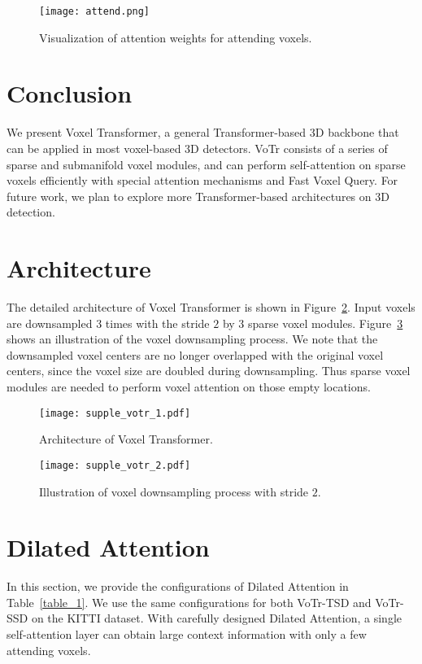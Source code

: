 \documentclass[10pt,twocolumn,letterpaper]{article}
\begin{document}
\begin{figure}[!t]
\centering
\texttt{[image: attend.png]}
\caption{Visualization of attention weights for attending voxels.}
\label{fig_weights}
\vspace{-2mm}
\end{figure}

\section{Conclusion}
We present Voxel Transformer, a general Transformer-based 3D backbone that can be applied in most voxel-based 3D detectors. VoTr consists of a series of sparse and submanifold voxel modules, and can perform self-attention on sparse voxels efficiently with special attention mechanisms and Fast Voxel Query. For future work, we plan to explore more Transformer-based architectures on 3D detection.


{\small


}
\clearpage
\appendix

\section{Architecture}
The detailed architecture of Voxel Transformer is shown in Figure~\ref{fig_achitect}. Input voxels are downsampled $3$ times with the stride $2$ by $3$ sparse voxel modules. Figure~\ref{fig_downsample} shows an illustration of the voxel downsampling process. We note that the downsampled voxel centers are no longer overlapped with the original voxel centers, since the voxel size are doubled during downsampling. Thus sparse voxel modules are needed to perform voxel attention on those empty locations.  

\begin{figure}[!t]
\centering
\texttt{[image: supple\_votr\_1.pdf]}
\caption{Architecture of Voxel Transformer.}
\label{fig_achitect}
\end{figure}

\begin{figure}[!t]
\centering
\texttt{[image: supple\_votr\_2.pdf]}
\caption{Illustration of voxel downsampling process with stride $2$.}
\label{fig_downsample}
\end{figure}

\section{Dilated Attention}
In this section, we provide the configurations of Dilated Attention in Table~\ref{table_1}. We use the same configurations for both VoTr-TSD and VoTr-SSD on the KITTI dataset. With carefully designed Dilated Attention, a single self-attention layer can obtain large context information with only a few attending voxels.  
\end{document}
